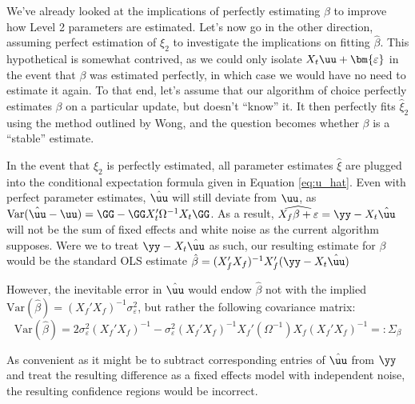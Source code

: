 
We've already looked at the implications of perfectly estimating $\beta$ to improve how Level 2 parameters are estimated. Let's now go in the other direction, assuming perfect estimation of $\xi_2$ to investigate the implications  on fitting $\hat{\beta}$. This hypothetical is somewhat contrived, as we could only isolate $X_t\uu + \bm{\varepsilon}$ in the event that $\beta$ was estimated perfectly, in which case we would have no need to estimate it again. To that end, let's assume that our algorithm of choice perfectly estimates $\beta$ on a particular update, but doesn't ``know'' it. It then perfectly fits $\hat{\xi}_2$ using the method outlined by Wong, and the question becomes whether $\beta$ is a ``stable'' estimate.

In the event that $\xi_2$ is perfectly estimated, all parameter estimates $\hat{\xi}$ are plugged into the conditional expectation formula given in Equation \ref{eq:u_hat}. Even with perfect parameter estimates, $\hat{\uu}$ will still deviate from $\uu$, as $\text{Var}(\hat{\uu} - \uu) = \GG - \GG X_t' \Omega ^ {-1} X_t\GG$. As a result, $\widehat{X_f\beta + \varepsilon} = \yy - X_t\hat{\uu}$ will not be the sum of fixed effects and white noise as the current algorithm supposes. Were we to treat $\yy - X_t\hat{\uu}$ as such, our resulting estimate for $\beta$ would be the standard OLS estimate $\hat{\beta} = (X_f'X_f) ^ {-1}X_f'(\yy - X_t\hat{\uu})$

However, the inevitable error in $\hat{\uu}$ would endow $\hat{\beta}$ not with the implied $\text{Var}(\hat{\beta}) = (X_f'X_f)^{-1}\sigma_\varepsilon^2$, but rather the following covariance matrix:
\begin{equation}
    \label{eq:var_beta_modugno}
     \text{Var}(\hat{\beta}) = 2\sigma_\varepsilon^2(X_f'X_f) ^ {-1} - \sigma_\varepsilon^2(X_f'X_f) ^ {-1} X_f' (\Omega^{-1} ) X_f ( X_f' X_f ) ^ {-1} =: \Sigma_\beta 
\end{equation}

As convenient as it might be to subtract corresponding entries of $\hat{\uu}$ from $\yy$ and treat the resulting difference as a fixed effects model with independent noise, the resulting confidence regions would be incorrect. 


